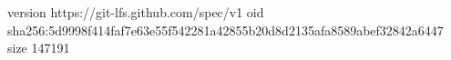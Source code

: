 version https://git-lfs.github.com/spec/v1
oid sha256:5d9998f414faf7e63e55f542281a42855b20d8d2135afa8589abef32842a6447
size 147191
